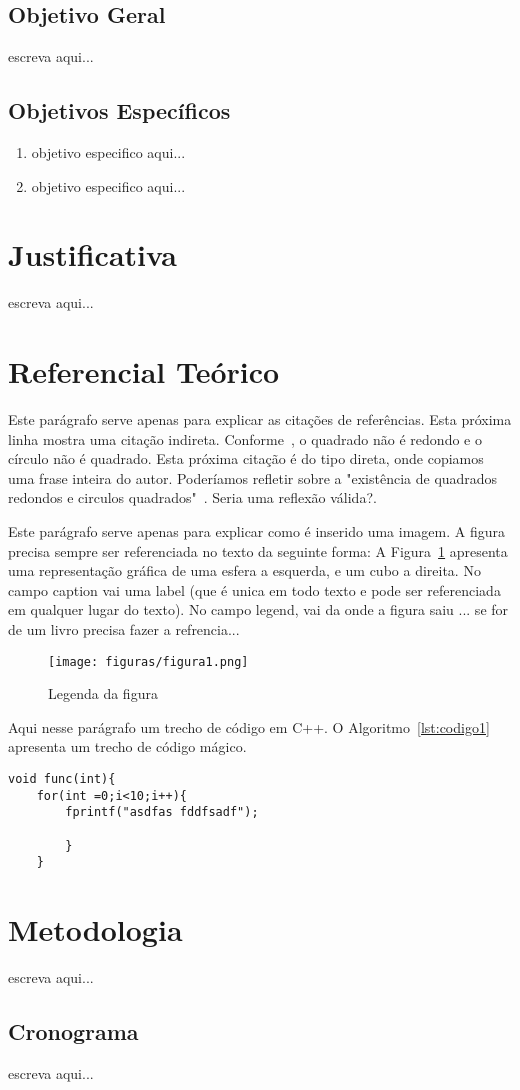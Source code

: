 \subsection{Objetivo Geral}
escreva aqui...

\subsection{Objetivos Específicos}
\begin{enumerate}
	\item objetivo especifico aqui...
	\item objetivo especifico aqui...
\end{enumerate}

\section{Justificativa}
escreva aqui...\\

\section{Referencial Teórico}
Este parágrafo serve apenas para explicar as citações de referências. Esta próxima linha mostra uma citação indireta. Conforme~, o quadrado não é redondo e o círculo não é quadrado. Esta próxima citação é do tipo direta, onde copiamos uma frase inteira do autor. Poderíamos refletir sobre a "existência de quadrados redondos e circulos quadrados"~\cite{ericson2004real}. Seria uma reflexão válida?.

Este parágrafo serve apenas para explicar como é inserido uma imagem. A figura precisa sempre ser referenciada no texto da seguinte forma: A Figura~\ref{fig:figura1} apresenta uma representação gráfica de uma esfera a esquerda, e um cubo a direita. No campo caption vai uma label (que é unica em todo texto e pode ser referenciada em qualquer lugar do texto). No campo legend, vai da onde a figura saiu ... se for de um livro precisa fazer a refrencia...

\begin{figure}[htb]
	\caption{\label{fig:figura1} Legenda da figura}
	\texttt{[image: figuras/figura1.png]}
	
\end{figure}


Aqui nesse parágrafo um trecho de código em C++. O Algoritmo~\ref{lst:codigo1} apresenta um trecho de código mágico.

\begin{lstlisting}[caption={Exemplo de laço},label={lst:codigo1}]
	void func(int){
	for(int =0;i<10;i++){
		fprintf("asdfas fddfsadf");
	
		}
	}
\end{lstlisting}



\section{Metodologia}
escreva aqui...

\subsection{Cronograma}
escreva aqui...

